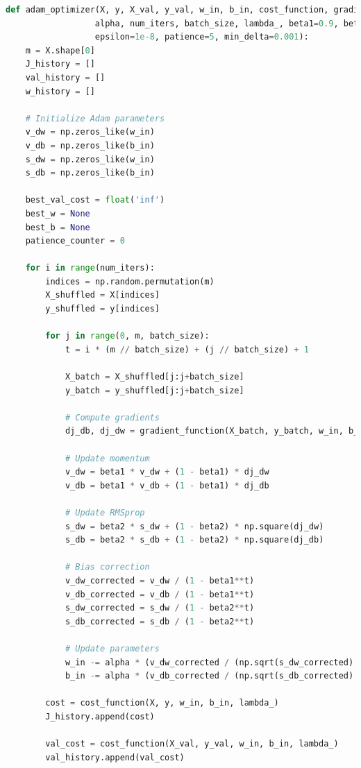 \documentclass[10pt,journal,compsoc]{IEEEtran}
\begin{document}
\begin{lstlisting}[language=Python]
def adam_optimizer(X, y, X_val, y_val, w_in, b_in, cost_function, gradient_function, 
                  alpha, num_iters, batch_size, lambda_, beta1=0.9, beta2=0.999,
                  epsilon=1e-8, patience=5, min_delta=0.001):
    m = X.shape[0]
    J_history = []
    val_history = []
    w_history = []
    
    # Initialize Adam parameters
    v_dw = np.zeros_like(w_in)
    v_db = np.zeros_like(b_in)
    s_dw = np.zeros_like(w_in)
    s_db = np.zeros_like(b_in)
    
    best_val_cost = float('inf')
    best_w = None
    best_b = None
    patience_counter = 0
    
    for i in range(num_iters):
        indices = np.random.permutation(m)
        X_shuffled = X[indices]
        y_shuffled = y[indices]
        
        for j in range(0, m, batch_size):
            t = i * (m // batch_size) + (j // batch_size) + 1
            
            X_batch = X_shuffled[j:j+batch_size]
            y_batch = y_shuffled[j:j+batch_size]
            
            # Compute gradients
            dj_db, dj_dw = gradient_function(X_batch, y_batch, w_in, b_in, lambda_)
            
            # Update momentum
            v_dw = beta1 * v_dw + (1 - beta1) * dj_dw
            v_db = beta1 * v_db + (1 - beta1) * dj_db
            
            # Update RMSprop
            s_dw = beta2 * s_dw + (1 - beta2) * np.square(dj_dw)
            s_db = beta2 * s_db + (1 - beta2) * np.square(dj_db)
            
            # Bias correction
            v_dw_corrected = v_dw / (1 - beta1**t)
            v_db_corrected = v_db / (1 - beta1**t)
            s_dw_corrected = s_dw / (1 - beta2**t)
            s_db_corrected = s_db / (1 - beta2**t)
            
            # Update parameters
            w_in -= alpha * (v_dw_corrected / (np.sqrt(s_dw_corrected) + epsilon))
            b_in -= alpha * (v_db_corrected / (np.sqrt(s_db_corrected) + epsilon))
        
        cost = cost_function(X, y, w_in, b_in, lambda_)
        J_history.append(cost)
        
        val_cost = cost_function(X_val, y_val, w_in, b_in, lambda_)
        val_history.append(val_cost)
        

\end{lstlisting}
\end{document}
